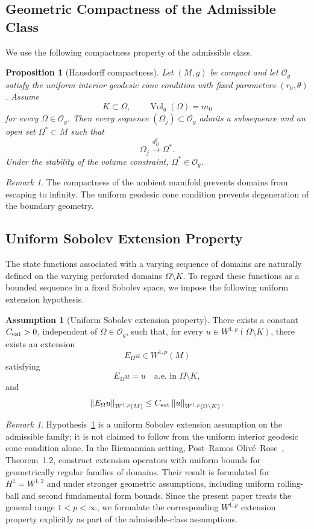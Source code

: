 \documentclass[11pt,a4paper]{article}
\newtheorem{proposition}[theorem]{Proposition}
\theoremstyle{definition}
\newtheorem{assumption}[theorem]{Assumption}
\theoremstyle{remark}
\newtheorem{remark}[theorem]{Remark}
\newcommand{\Og}{\mathcal{O}_g}
\newcommand{\Vol}{\operatorname{Vol}_g}
\begin{document}
\subsection{Geometric Compactness of the Admissible Class}

We use the following compactness property of the admissible class.

\begin{proposition}[Hausdorff compactness]
\label{prop:hausdorff-compactness}
Let $(M,g)$ be compact and let $\Og$ satisfy the uniform interior
geodesic cone condition with fixed parameters $(r_0,\theta)$. Assume
\[
K\subset\Omega,
\qquad
\Vol(\Omega)=m_0
\]
for every $\Omega\in\Og$. Then every sequence
$(\Omega_j)\subset\Og$ admits a subsequence and an open set
$\Omega^\ast\subset M$ such that
\[
\Omega_j\xrightarrow{d_H^g}\Omega^\ast.
\]
Under the stability of the volume constraint, $\Omega^\ast\in\Og$.
\end{proposition}

\begin{remark}
The compactness of the ambient manifold prevents domains from
escaping to infinity. The uniform geodesic cone condition prevents
degeneration of the boundary geometry.
\end{remark}

\subsection{Uniform Sobolev Extension Property}

The state functions associated with a varying sequence of domains are
naturally defined on the varying perforated domains
$\Omega\setminus K$. To regard these functions as a bounded
sequence in a fixed Sobolev space, we impose the following uniform
extension hypothesis.

\begin{assumption}[Uniform Sobolev extension property]
\label{hyp:extension}
There exists a constant $C_{\rm ext}>0$, independent of
$\Omega\in\mathcal O_g$, such that, for every
$u\in W^{1,p}(\Omega\setminus K)$, there exists an extension
\[
E_\Omega u\in W^{1,p}(M)
\]
satisfying
\[
E_\Omega u=u\quad\text{a.e. in }\Omega\setminus K,
\]
and
\[
\left\|E_\Omega u\right\|_{W^{1,p}(M)}
\leq C_{\rm ext}
\left\|u\right\|_{W^{1,p}(\Omega\setminus K)}.
\]
\end{assumption}

\begin{remark}
Hypothesis~\ref{hyp:extension} is a uniform Sobolev extension
assumption on the admissible family; it is not claimed to follow from
the uniform interior geodesic cone condition alone. In the Riemannian
setting, Post--Ramos Oliv\'e--Rose~\cite{PostRamosOliveRose2023},
Theorem~1.2, construct extension operators with uniform bounds for
geometrically regular families of domains. Their result is formulated
for $H^1=W^{1,2}$ and under stronger geometric assumptions, including
uniform rolling-ball and second fundamental form bounds. Since the
present paper treats the general range $1<p<\infty$, we formulate the
corresponding $W^{1,p}$ extension property explicitly as part of the
admissible-class assumptions. 
\end{remark}
\end{document}
